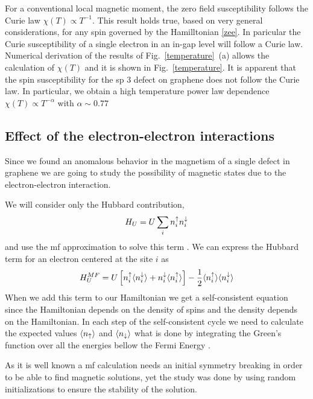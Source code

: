 For a conventional local magnetic moment, the zero field susceptibility follows the Curie law $\chi(T)\propto T^{-1}$. This result holds true, based on very general considerations, for any spin governed by the Hamilltonian \eqref{zee}.
In paricular the Curie susceptibility of a single electron in an in-gap level will follow a Curie law. Numerical derivation of the results of Fig.~\ref{temperature}~(a) allows the calculation of $\chi(T)$ and it is shown in Fig.~\ref{temperature}. It is apparent that the spin susceptibility for the sp 3 defect on graphene does not follow the Curie law. In particular, we obtain a high temperature power law dependence $\chi(T)\propto T^{-\alpha}$ with $\alpha\sim0.77$








\subsection{Effect of the electron-electron interactions}
Since we found an anomalous behavior in the magnetism of a single defect in graphene we are going to study the possibility of magnetic states due to the electron-electron interaction.

We will consider only the Hubbard contribution,
\begin{equation}
  H_{U} = U \sum_{i}n^{\uparrow}_{i}n^{\downarrow}_{i}
\end{equation}
and use the \ac{mf} approximation to solve this term . We can express the Hubbard term for an electron centered at the site $i$ as
\begin{equation}
  H^{MF}_{U} = U\left[n^{\uparrow}_{i}\langle n^{\downarrow}_{i}\rangle +
              n^{\downarrow}_{i}\langle n^{\uparrow}_{i}\rangle\right]-
              \frac{1}{2}\langle n^{\uparrow}_{i}\rangle \langle n^{\downarrow}_{i}\rangle
\end{equation}
When we add this term to our Hamiltonian we get a self-consistent equation since the Hamiltonian depends on the density of spins and the density depends on the Hamiltonian. In each step of the self-consistent cycle we need to calculate the expected values $\langle n_{\uparrow}\rangle$ and $\langle n_{\downarrow}\rangle$ what is done by integrating the Green's function over all the energies bellow the Fermi Energy .

As it is well known a \ac{mf} calculation needs an initial symmetry breaking in order to be able to find magnetic solutions, yet the study was done by using random initializations to ensure the stability of the solution.

